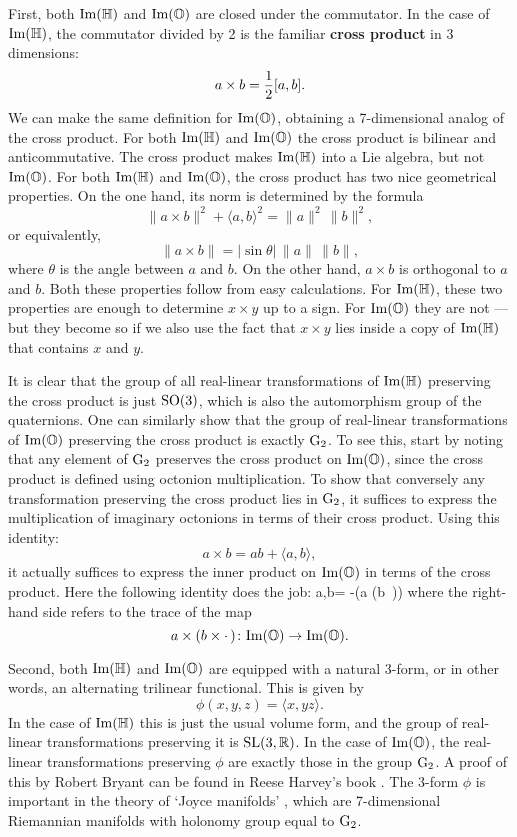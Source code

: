 First, both ${\rm Im}({\mathbb H})$ and ${\rm Im}({\mathbb O})$ are closed under the commutator. In    
the case of ${\rm Im}({\mathbb H})$, the commutator divided by 2 is the familiar {\bf   
cross product} in 3 dimensions:   
\[            a \times b = {1\over 2}[a,b]  .\]   
We can make the same definition for ${\rm Im}({\mathbb O})$, obtaining a 7-dimensional   
analog of the cross product.   For both ${\rm Im}({\mathbb H})$ and ${\rm Im}({\mathbb O})$ the   
cross product is bilinear and anticommutative.   The cross product   
makes ${\rm Im}({\mathbb H})$ into a Lie algebra, but not ${\rm Im}({\mathbb O})$.  For both   
${\rm Im}({\mathbb H})$ and ${\rm Im}({\mathbb O})$, the cross product has two nice    
geometrical properties.  On the one hand, its norm is determined by the    
formula   
\[    \|a \times b\|^2 + \langle a,b\rangle^2 = \|a\|^2 \, \|b\|^2 , \]   
or equivalently,    
\[   \|a \times b\| = | {\sin \theta}| \, \|a\| \, \|b\| ,  \]   
where $\theta$ is the angle between $a$ and $b$.  On the other hand, $a   
\times b$ is orthogonal to $a$ and $b$.  Both these properties follow   
from easy calculations.  For ${\rm Im}({\mathbb H})$, these two properties are enough   
to determine $x \times y$ up to a sign.  For ${\rm Im}({\mathbb O})$ they are not ---   
but they become so if we also use the fact that $x \times y$ lies inside   
a copy of ${\rm Im}({\mathbb H})$ that contains $x$ and $y$.    
   
It is clear that the group of all real-linear transformations of   
${\rm Im}({\mathbb H})$ preserving the cross product is just ${\rm SO}(3)$, which is also   
the automorphism group of the quaternions.  One can similarly show that   
the group of real-linear transformations of ${\rm Im}({\mathbb O})$ preserving the   
cross product is exactly ${\rm G}_2$.  To see this, start by noting that any   
element of ${\rm G}_2$ preserves the cross product on ${\rm Im}({\mathbb O})$, since the   
cross product is defined using octonion multiplication.  To show that   
conversely any transformation preserving the cross product lies in   
${\rm G}_2$, it suffices to express the multiplication of imaginary octonions    
in terms of their cross product.  Using this identity:   
\[  a \times b = ab + \langle a, b\rangle   , \]   
it actually suffices to express the inner product on ${\rm Im}({\mathbb O})$ in terms   
of the cross product.  Here the following identity does the job:    
\be  \langle a,b\rangle =   
-\tr(a \times (b \times \cdot\,))    
\label{inner} \ee   
where the right-hand side refers to the trace of the map   
\[       a \times (b \times \cdot\,) \colon {\rm Im}({\mathbb O}) \to {\rm Im}({\mathbb O})  .\]   
   
Second, both ${\rm Im}({\mathbb H})$ and ${\rm Im}({\mathbb O})$ are equipped with a natural 3-form,   
or in other words, an alternating trilinear functional.  This is given   
by   
\[        \phi(x,y,z) = \langle x,yz \rangle  .\]   
In the case of ${\rm Im}({\mathbb H})$ this is just the usual volume form, and the   
group of real-linear transformations preserving it is ${\rm SL}(3, {\mathbb R})$.   In   
the case of ${\rm Im}({\mathbb O})$, the real-linear transformations preserving $\phi$   
are exactly those in the group ${\rm G}_2$.  A proof of this by Robert  
Bryant can be found in Reese Harvey's book \cite{Harvey}.   The 3-form   
$\phi$ is important in the theory of `Joyce manifolds' \cite{Joyce},  
which are 7-dimensional Riemannian manifolds with holonomy group equal  
to ${\rm G}_2$.  
   
